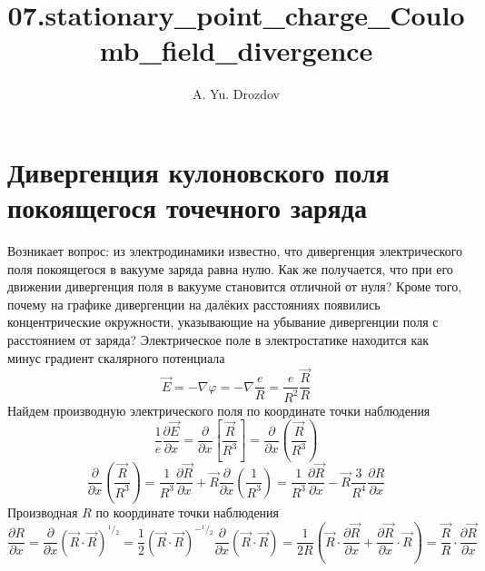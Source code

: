 \documentclass[11pt]{article}
\author{A. Yu. Drozdov}
\title{07.stationary\_point\_charge\_Coulomb\_field\_divergence}
\begin{document}
    
    \maketitle
    
    

    
    \section{Дивергенция кулоновского поля покоящегося точечного
заряда}\label{ux434ux438ux432ux435ux440ux433ux435ux43dux446ux438ux44f-ux43aux443ux43bux43eux43dux43eux432ux441ux43aux43eux433ux43e-ux43fux43eux43bux44f-ux43fux43eux43aux43eux44fux449ux435ux433ux43eux441ux44f-ux442ux43eux447ux435ux447ux43dux43eux433ux43e-ux437ux430ux440ux44fux434ux430}

Возникает вопрос: из электродинамики известно, что дивергенция
электрического поля покоящегося в вакууме заряда равна нулю. Как же
получается, что при его движении дивергенция поля в вакууме становится
отличной от нуля? Кроме того, почему на графике дивергенции на далёких
расстояниях появились концентрические окружности, указывающие на
убывание дивергенции поля с расстоянием от заряда? Электрическое поле в
электростатике находится как минус градиент скалярного потенциала
\[\overrightarrow{E}=-\nabla \varphi =-\nabla \frac{e}{R}=\frac{e}{{{R}^{2}}}\frac{\overrightarrow{R}}{R}\]
Найдем производную электрического поля по координате точки наблюдения
\[\frac{1}{e}\frac{\partial \overrightarrow{E}}{\partial x}=\frac{\partial }{\partial x}\left[ \frac{\overrightarrow{R}}{{{R}^{3}}} \right]=\frac{\partial }{\partial x}\left( \frac{\overrightarrow{R}}{{{R}^{3}}} \right)\]
\[\frac{\partial }{\partial x}\left( \frac{\overrightarrow{R}}{{{R}^{3}}} \right)=\frac{1}{{{R}^{3}}}\frac{\partial \overrightarrow{R}}{\partial x}+\overrightarrow{R}\frac{\partial }{\partial x}\left( \frac{1}{{{R}^{3}}} \right)=\frac{1}{{{R}^{3}}}\frac{\partial \overrightarrow{R}}{\partial x}-\overrightarrow{R}\frac{3}{{{R}^{4}}}\frac{\partial R}{\partial x}\]
Производная \(R\) по координате точки наблюдения
\[\frac{\partial R}{\partial x}=\frac{\partial }{\partial x}{{\left( \overrightarrow{R}\cdot \overrightarrow{R} \right)}^{{}^{1}/{}_{2}}}=\frac{1}{2}{{\left( \overrightarrow{R}\cdot \overrightarrow{R} \right)}^{-{}^{1}/{}_{2}}}\frac{\partial }{\partial x}\left( \overrightarrow{R}\cdot \overrightarrow{R} \right)=\frac{1}{2R}\left( \overrightarrow{R}\cdot \frac{\partial \overrightarrow{R}}{\partial x}+\frac{\partial \overrightarrow{R}}{\partial x}\cdot \overrightarrow{R} \right)=\frac{\overrightarrow{R}}{R}\cdot \frac{\partial \overrightarrow{R}}{\partial x}\]
\end{document}
